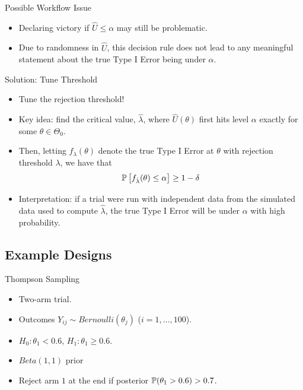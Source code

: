 \begin{frame}{Possible Workflow Issue}
\begin{itemize}
    \item Declaring victory if $\hat{U} \leq \alpha$ may still be problematic.
    \item Due to randomness in $\hat{U}$, this decision rule does not lead to any meaningful statement about the true Type I Error being under $\alpha$.
\end{itemize}
\end{frame}

\begin{frame}{Solution: Tune Threshold}
\begin{itemize}
    \item Tune the rejection threshold!
    \item Key idea: find the critical value, $\hat{\lambda}$, where $\hat{U}(\theta)$ first hits level $\alpha$ exactly for some $\theta \in \Theta_0$.
    \item Then, letting $f_\lambda(\theta)$ denote the true Type I Error at $\theta$ with rejection threshold $\lambda$, we have that
        \begin{align*}
            \mathbb{P}\left[f_{\hat{\lambda}}(\theta) \leq \alpha\right] \geq 1-\delta
        \end{align*}
    \item Interpretation: if a trial were run with independent data from the simulated data used to compute $\hat{\lambda}$,
        the true Type I Error will be under $\alpha$ with high probability. 
\end{itemize}
\end{frame}

\subsection{Example Designs}

\begin{frame}{Thompson Sampling}
\begin{itemize}
    \item Two-arm trial.
    \item Outcomes $Y_{ij} \sim Bernoulli(\theta_j)$ ($i=1,\ldots,100$).
    \item $H_0: \theta_1 < 0.6$, $H_1: \theta_1 \geq 0.6$.
    \item $Beta(1,1)$ prior
    \item Reject arm $1$ at the end if posterior $\mathbb{P}(\theta_1  > 0.6) > 0.7$.
\end{itemize}
\end{frame}

